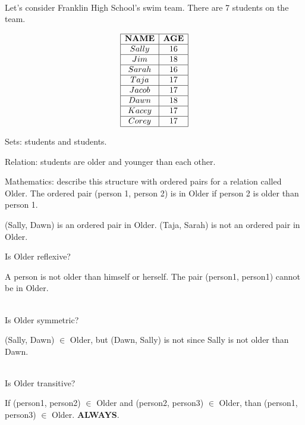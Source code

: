 \documentclass{ximera}
\begin{document}
\begin{example} 
\quad \\
Let's consider Franklin High School's swim team. There are 7 students on the team. 

\begin{center}
\[
\begin{array}{|c|c|}
\hline
\textbf{NAME} & \textbf{AGE} \\\hline
Sally & 16 \\\hline
Jim & 18 \\\hline
Sarah & 16 \\\hline
Taja & 17 \\\hline
Jacob & 17 \\\hline
Dawn & 18 \\\hline
Kacey & 17 \\\hline
Corey & 17 \\\hline
\end{array}
\]
\end{center}




Sets: students and students.

Relation: students are older and younger than each other.

Mathematics: describe this structure with ordered pairs for a relation called Older. The ordered pair (person 1, person 2) is in Older if person 2 is older than person 1. 

(Sally, Dawn) is an ordered pair in Older.  (Taja, Sarah) is not an ordered pair in Older.

Is Older reflexive? 
\begin{multipleChoice}
\end{multipleChoice}
\begin{feedback}
A person is not older than himself or herself. The pair (person1, person1) cannot be in Older. 
\end{feedback}
\quad \\

Is Older symmetric? 
\begin{multipleChoice}
\end{multipleChoice}
\begin{feedback}
(Sally, Dawn) $\in$ Older, but (Dawn, Sally) is not since Sally is not older than Dawn.
\end{feedback}
\quad \\

Is Older transitive? 
\begin{multipleChoice}
\end{multipleChoice}
\begin{feedback}
If (person1, person2) $\in$ Older and (person2, person3) $\in$ Older, than (person1, person3) $\in$ Older. \textbf{ALWAYS}.   
\end{feedback}
                   
\end{example}
\quad \\                                                                                     
\end{document}
